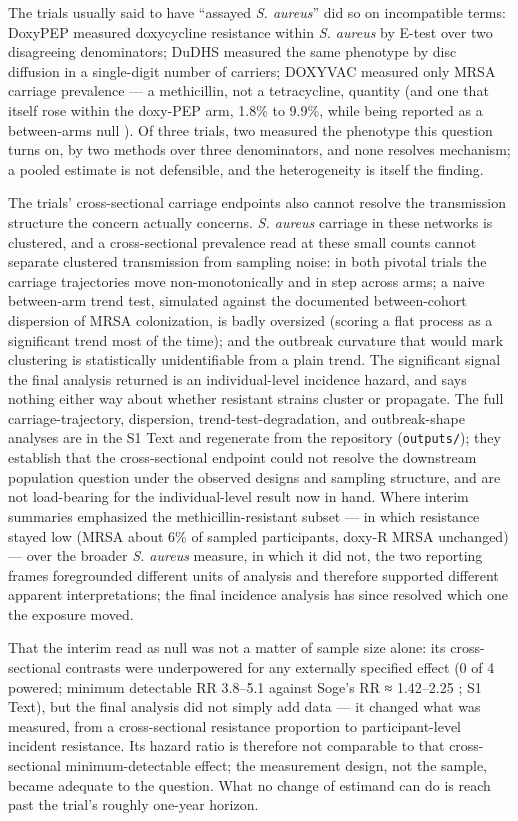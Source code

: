 \documentclass[10pt,letterpaper]{article}
\begin{document}
The trials usually said to have ``assayed \emph{S. aureus}'' did so on
incompatible terms: DoxyPEP measured doxycycline resistance within \emph{S. aureus} by E-test over
two disagreeing denominators; DuDHS measured the same phenotype by disc
diffusion in a single-digit number of carriers; DOXYVAC measured only
MRSA carriage prevalence --- a methicillin, not a tetracycline,
quantity (and one that itself rose within the doxy-PEP arm, 1.8\% to
9.9\%, while being reported as a between-arms null
\cite{vanbaelen2024c}). Of three trials, two measured the phenotype
this question turns on, by two methods over three denominators, and none
resolves mechanism; a pooled estimate is not defensible, and the
heterogeneity is itself the finding.

The trials' cross-sectional carriage endpoints also cannot resolve the
transmission structure the concern actually concerns. \emph{S. aureus}
carriage in these networks is clustered, and a cross-sectional
prevalence read at these small counts cannot separate clustered
transmission from sampling noise: in both pivotal trials the carriage
trajectories move non-monotonically and in step across arms; a naive
between-arm trend test, simulated against the documented between-cohort
dispersion of MRSA colonization, is badly oversized (scoring a flat
process as a significant trend most of the time); and the outbreak
curvature that would mark clustering is statistically unidentifiable
from a plain trend. The significant signal the final analysis returned
is an individual-level incidence hazard, and says nothing either
way about whether resistant strains cluster or propagate. The full
carriage-trajectory, dispersion, trend-test-degradation, and
outbreak-shape analyses are in the S1 Text and regenerate
from the repository (\texttt{outputs/}); they establish that the cross-sectional endpoint could not resolve the downstream population question under the observed designs and sampling structure, and are not load-bearing for the individual-level
result now in hand. Where interim summaries emphasized the
methicillin-resistant subset --- in which resistance stayed low (MRSA
about 6\% of sampled participants, doxy-R MRSA unchanged) --- over the
broader \emph{S. aureus} measure, in which it did not, the two reporting
frames foregrounded different units of analysis and therefore supported
different apparent interpretations; the final incidence analysis has
since resolved which one the exposure moved.

That the interim read as null was not a matter of sample size alone:
its cross-sectional contrasts were underpowered for any externally
specified effect (0 of 4 powered; minimum detectable RR 3.8--5.1 against
Soge's RR ≈ 1.42--2.25 \cite{soge2025}; S1 Text), but
the final analysis did not simply add data --- it changed what was
measured, from a cross-sectional resistance proportion to
participant-level incident resistance. Its hazard ratio is
therefore not comparable to that cross-sectional minimum-detectable
effect; the measurement design, not the sample, became adequate
to the question. What no change of estimand can do is reach past the
trial's roughly one-year horizon.
\end{document}
